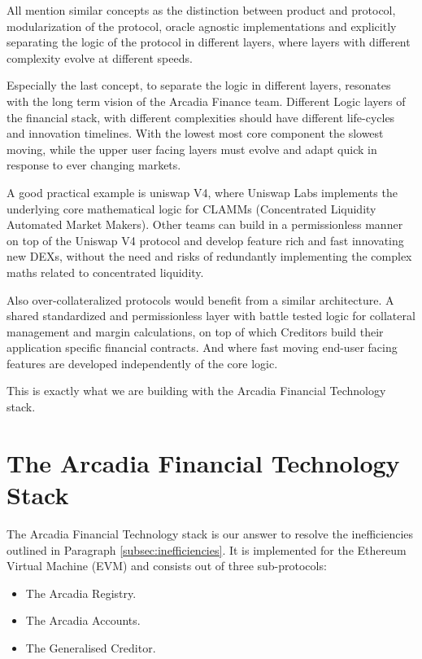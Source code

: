 \documentclass[sigconf,nonacm]{acmart}
\begin{document}
All mention similar concepts as the distinction between product and protocol, modularization of the protocol,
oracle agnostic implementations and explicitly separating the logic of the protocol in different layers,
where layers with different complexity evolve at different speeds.

Especially the last concept, to separate the logic in different layers, resonates with the long term vision of the Arcadia Finance team.
Different Logic layers of the financial stack, with different complexities should have different life-cycles and innovation timelines.
With the lowest most core component the slowest moving, while the upper user facing layers must evolve and adapt quick in response to ever changing markets.

A good practical example is uniswap V4,
where Uniswap Labs implements the underlying core mathematical logic for CLAMMs (Concentrated Liquidity Automated Market Makers).
Other teams can build in a permissionless manner on top of the Uniswap V4 protocol and develop feature rich and fast innovating new DEXs,
without the need and risks of redundantly implementing the complex maths related to concentrated liquidity.

Also over-collateralized protocols would benefit from a similar architecture.
A shared standardized and permissionless layer with battle tested logic for collateral management and margin calculations,
on top of which Creditors build their application specific financial contracts.
And where fast moving end-user facing features are developed independently of the core logic.

This is exactly what we are building with the Arcadia Financial Technology stack.

\section{The Arcadia Financial Technology Stack}
\label{sec:arcadia-financial-technology-stack}

The Arcadia Financial Technology stack is our answer to resolve the inefficiencies outlined in Paragraph \ref{subsec:inefficiencies}.
It is implemented for the Ethereum Virtual Machine (EVM) and consists out of three sub-protocols:
\begin{itemize}
    \item The Arcadia Registry.
    \item The Arcadia Accounts.
    \item The Generalised Creditor.
\end{itemize}
\end{document}
